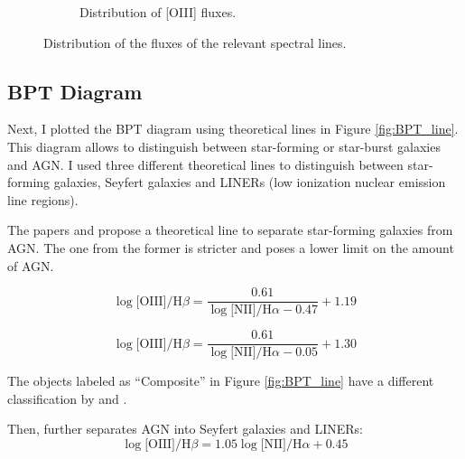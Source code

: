 \documentclass[letterpaper, oneside]{article}
\begin{document}
\begin{figure}[h]
\begin{subfigure}[b]{0.45\textwidth}
		\caption[]{Distribution of [OIII] fluxes.}
		\label{fig:distr_oiii}
	\end{subfigure}
	\caption{Distribution of the fluxes of the relevant spectral lines.} 
	\label{fig:flux_distributions}
\end{figure}

\subsection{BPT Diagram}\label{bpt_diagram_section}

Next, I plotted the BPT diagram using theoretical lines in Figure \ref{fig:BPT_line}. This diagram allows to distinguish between star-forming or star-burst galaxies and AGN. I used three different theoretical lines to distinguish between star-forming galaxies, Seyfert galaxies and LINERs (low ionization nuclear emission line regions).

The papers \cite{Kewley_2001} and \cite{Kauffmann_2003} propose a theoretical line to separate star-forming galaxies from AGN. The one from the former is stricter and poses a lower limit on the amount of AGN.

\begin{equation} \label{kewley}
	\log{ \text{[OIII]} / {\text{H}\beta} } = \frac{0.61}{\log{ \text{[NII]} / {\text{H}\alpha} } - 0.47} + 1.19
\end{equation}

\begin{equation} \label{kauffman}
	\log{ \text{[OIII]} / {\text{H}\beta} } = \frac{0.61}{\log{ \text{[NII]} / {\text{H}\alpha} } - 0.05} + 1.30
\end{equation}

The objects labeled as ``Composite'' in Figure \ref{fig:BPT_line} have a different classification by \cite{Kewley_2001} and \cite{Kauffmann_2003}.

Then, \cite{Schawinski_2007} further separates AGN into Seyfert galaxies and LINERs:
\begin{equation} \label{shawinksi}
	\log{ \text{[OIII]} / {\text{H}\beta} } = 1.05 \log{ \text{[NII]} / {\text{H}\alpha} } + 0.45
\end{equation}
\end{document}
